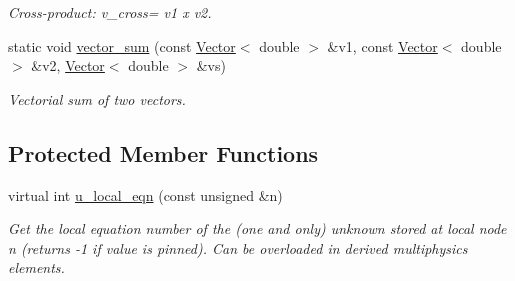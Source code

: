 \begin{DoxyCompactItemize}
\begin{DoxyCompactList}\small\item\em Cross-\/product\+: v\+\_\+cross= v1 x v2. \end{DoxyCompactList}\item 
static void \hyperlink{classoomph_1_1YoungLaplaceEquations_afb7ff7fc54e453324abdd29565ba8599}{vector\+\_\+sum} (const \hyperlink{classoomph_1_1Vector}{Vector}$<$ double $>$ \&v1, const \hyperlink{classoomph_1_1Vector}{Vector}$<$ double $>$ \&v2, \hyperlink{classoomph_1_1Vector}{Vector}$<$ double $>$ \&vs)
\begin{DoxyCompactList}\small\item\em Vectorial sum of two vectors. \end{DoxyCompactList}\end{DoxyCompactItemize}
\subsection*{Protected Member Functions}
\begin{DoxyCompactItemize}
\item 
virtual int \hyperlink{classoomph_1_1YoungLaplaceEquations_a60c1e853d0f03470caec1b76c8fa9226}{u\+\_\+local\+\_\+eqn} (const unsigned \&n)
\begin{DoxyCompactList}\small\item\em Get the local equation number of the (one and only) unknown stored at local node n (returns -\/1 if value is pinned). Can be overloaded in derived multiphysics elements. \end{DoxyCompactList}\end{DoxyCompactItemize}
